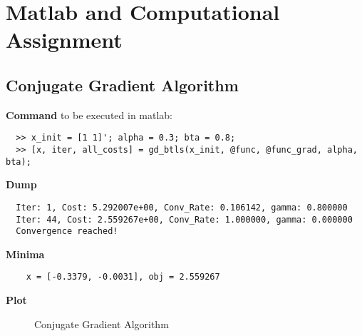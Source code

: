 \documentclass[11pt,a4paper]{article}
\begin{document}
\begin{titlepage}
    \maketitle
\end{titlepage}
\renewcommand{\contentsname}{Table of Contents}
\begin{center} 
    \tableofcontents 
    \listoffigures
\end{center}
\newpage

\section{Matlab and Computational Assignment}
\subsection{Conjugate Gradient Algorithm}
{\bf Command} to be executed in matlab:
\begin{verbatim}
  >> x_init = [1 1]'; alpha = 0.3; bta = 0.8;
  >> [x, iter, all_costs] = gd_btls(x_init, @func, @func_grad, alpha, bta);
\end{verbatim}
{\bf Dump}
\begin{verbatim}
  Iter: 1, Cost: 5.292007e+00, Conv_Rate: 0.106142, gamma: 0.800000
  Iter: 44, Cost: 2.559267e+00, Conv_Rate: 1.000000, gamma: 0.000000
  Convergence reached!
\end{verbatim}
{\bf Minima}
\begin{verbatim}
    x = [-0.3379, -0.0031], obj = 2.559267 
   \end{verbatim}
{\bf Plot}
\begin{figure}[h]
    \centering
    \caption{Conjugate Gradient Algorithm}
\end{figure}
\end{document}

